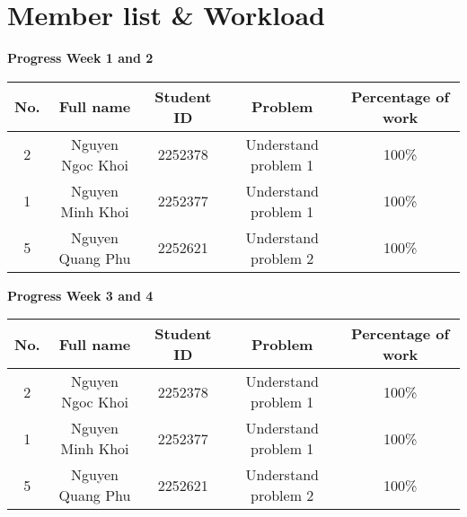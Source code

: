 \section{Member list \& Workload}

\begin{center}
    {\textbf{\huge Progress Week 1 and 2}}
\end{center}

\begin{center}
\renewcommand{\arraystretch}{1.5}
\begin{tabular}{||c|c|c|c|c||}
\hline
\multirow{1}{*}{\textbf{No.}} & \multirow{1}{*}{\textbf{Full name}} & \multirow{1}{*}{\textbf{Student ID}} & \multirow{1}{*}{\textbf{Problem}} & \multirow{1}{*}{\textbf{Percentage of work}}\\
\hline
\multirow{1}{*}{2} & \multirow{1}{*}{Nguyen Ngoc Khoi} & \multirow{1}{*}{2252378} & \multirow{1}{*}{Understand problem 1} & \multirow{1}{*}{100\%}\\
\hline
\multirow{1}{*}{1} & \multirow{1}{*}{Nguyen Minh Khoi} & \multirow{1}{*}{2252377} & \multirow{1}{*}{Understand problem 1} & \multirow{1}{*}{100\%}\\
\hline
\multirow{1}{*}{5} & \multirow{1}{*}{Nguyen Quang Phu} & \multirow{1}{*}{2252621} & \multirow{1}{*}{Understand problem 2} & \multirow{1}{*}{100\%}\\
\hline
\end{tabular}
\end{center}

\vspace{1em}

\begin{center}
    {\textbf{\huge Progress Week 3 and 4}}
\end{center}
\begin{center}
\renewcommand{\arraystretch}{1.5}
\begin{tabular}{||c|c|c|c|c||}
\hline
\multirow{1}{*}{\textbf{No.}} & \multirow{1}{*}{\textbf{Full name}} & \multirow{1}{*}{\textbf{Student ID}} & \multirow{1}{*}{\textbf{Problem}} & \multirow{1}{*}{\textbf{Percentage of work}}\\
\hline
\multirow{1}{*}{2} & \multirow{1}{*}{Nguyen Ngoc Khoi} & \multirow{1}{*}{2252378} & \multirow{1}{*}{Understand problem 1} & \multirow{1}{*}{100\%}\\
\hline
\multirow{1}{*}{1} & \multirow{1}{*}{Nguyen Minh Khoi} & \multirow{1}{*}{2252377} & \multirow{1}{*}{Understand problem 1} & \multirow{1}{*}{100\%}\\
\hline
\multirow{1}{*}{5} & \multirow{1}{*}{Nguyen Quang Phu} & \multirow{1}{*}{2252621} & \multirow{1}{*}{Understand problem 2} & \multirow{1}{*}{100\%}\\
\hline
\end{tabular}
\end{center}

